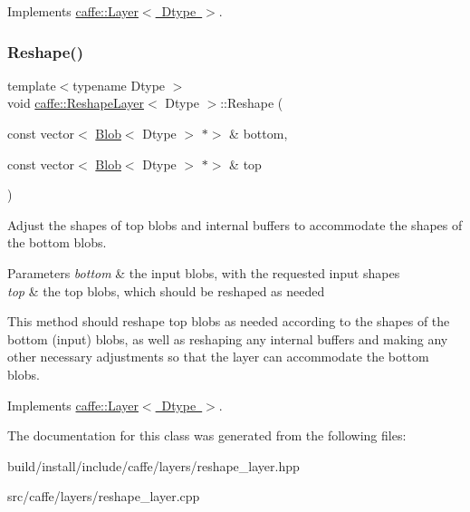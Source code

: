 Implements \mbox{\hyperlink{classcaffe_1_1_layer_a7fe981e8af8d93d587acf2a952be563d}{caffe\+::\+Layer$<$ Dtype $>$}}.

\mbox{\label{classcaffe_1_1_reshape_layer_a5b85ce44e23b4f958a60ff2b2c43e61f}} 
\subsubsection{\texorpdfstring{Reshape()}{Reshape()}\hspace{0.1cm}{\footnotesize\ttfamily [2/2]}}
{\footnotesize\ttfamily template$<$typename Dtype $>$ \\
void \mbox{\hyperlink{classcaffe_1_1_reshape_layer}{caffe\+::\+Reshape\+Layer}}$<$ Dtype $>$\+::Reshape (\begin{DoxyParamCaption}\item[{const vector$<$ \mbox{\hyperlink{classcaffe_1_1_blob}{Blob}}$<$ Dtype $>$ $\ast$$>$ \&}]{bottom,  }\item[{const vector$<$ \mbox{\hyperlink{classcaffe_1_1_blob}{Blob}}$<$ Dtype $>$ $\ast$$>$ \&}]{top }\end{DoxyParamCaption})\hspace{0.3cm}{\ttfamily [virtual]}}



Adjust the shapes of top blobs and internal buffers to accommodate the shapes of the bottom blobs. 


\begin{DoxyParams}{Parameters}
{\em bottom} & the input blobs, with the requested input shapes \\
\hline
{\em top} & the top blobs, which should be reshaped as needed\\
\hline
\end{DoxyParams}
This method should reshape top blobs as needed according to the shapes of the bottom (input) blobs, as well as reshaping any internal buffers and making any other necessary adjustments so that the layer can accommodate the bottom blobs. 

Implements \mbox{\hyperlink{classcaffe_1_1_layer_a7fe981e8af8d93d587acf2a952be563d}{caffe\+::\+Layer$<$ Dtype $>$}}.



The documentation for this class was generated from the following files\+:\begin{DoxyCompactItemize}
\item 
build/install/include/caffe/layers/reshape\+\_\+layer.\+hpp\item 
src/caffe/layers/reshape\+\_\+layer.\+cpp\end{DoxyCompactItemize}
